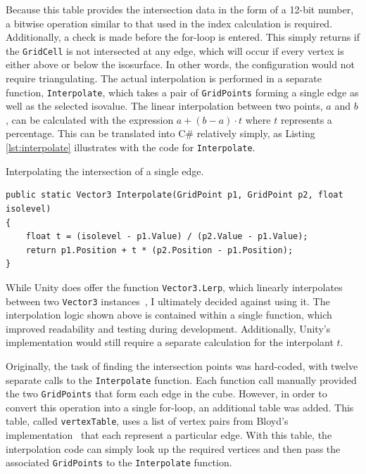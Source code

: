 \documentclass[pageno]{jpaper}
\begin{document}
Because this table provides the intersection data in the form of a 12-bit number, a bitwise operation similar to that used in the index calculation is required. Additionally, a check is made before the for-loop is entered. This simply returns if the \texttt{GridCell} is not intersected at any edge, which will occur if every vertex is either above or below the isosurface. In other words, the configuration would not require triangulating. The actual interpolation is performed in a separate function, \texttt{Interpolate}, which takes a pair of \texttt{GridPoints} forming a single edge as well as the selected isovalue. The linear interpolation between two points, $a$ and $b$, can be calculated with the expression $a + (b-a) \cdot t$ where $t$ represents a percentage. This can be translated into C\# relatively simply, as Listing \ref{lst:interpolate} illustrates with the code for \texttt{Interpolate}.

\begin{listing}[H]
\linespread{1.0}
\caption{Interpolating the intersection of a single edge.}
\begin{verbatim}
public static Vector3 Interpolate(GridPoint p1, GridPoint p2, float isolevel)
{
    float t = (isolevel - p1.Value) / (p2.Value - p1.Value);
    return p1.Position + t * (p2.Position - p1.Position);
}
\end{verbatim}
\label{lst:interpolate}
\end{listing}

While Unity does offer the function \texttt{Vector3.Lerp}, which linearly interpolates between two \texttt{Vector3} instances~\cite{unitylerp}, I ultimately decided against using it. The interpolation logic shown above is contained within a single function, which improved readability and testing during development. Additionally, Unity's implementation would still require a separate calculation for the interpolant $t$.

Originally, the task of finding the intersection points was hard-coded, with twelve separate calls to the \texttt{Interpolate} function. Each function call manually provided the two \texttt{GridPoints} that form each edge in the cube. However, in order to convert this operation into a single for-loop, an additional table was added. This table, called \texttt{vertexTable}, uses a list of vertex pairs from Bloyd's implementation~\cite{bloyd} that each represent a particular edge. With this table, the interpolation code can simply look up the required vertices and then pass the associated \texttt{GridPoints} to the \texttt{Interpolate} function.
\end{document}
